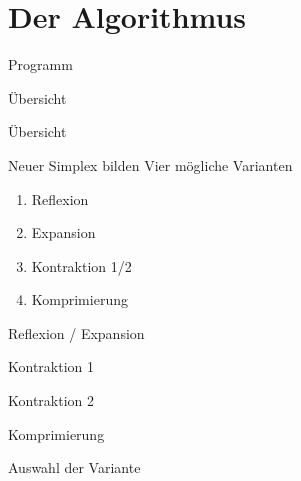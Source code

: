 \section{Der Algorithmus} 
\begin{frame}{Programm}\tableofcontents[currentsection]\end{frame}

\begin{frame}{Übersicht}
\newcommand{\highlight}{white}

\end{frame}
\begin{frame}{Übersicht}
\newcommand{\highlight}{green}

\end{frame}

\begin{frame}{Neuer Simplex bilden}
Vier mögliche Varianten
\begin{enumerate}
\item Reflexion
\item Expansion
\item Kontraktion 1/2
\item Komprimierung
\end{enumerate}
\end{frame}

\begin{frame}{Reflexion / Expansion}

\end{frame}

\begin{frame}{Kontraktion 1}

\end{frame}

\begin{frame}{Kontraktion 2}

\end{frame}

\begin{frame}{Komprimierung}

\end{frame}

\begin{frame}{Auswahl der Variante}

\end{frame}